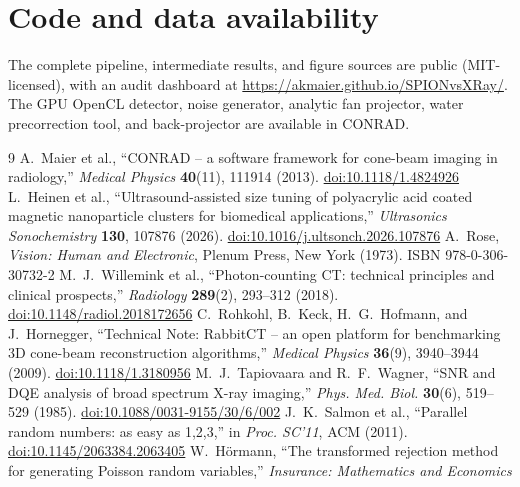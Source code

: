 \documentclass[]{spie}  %
\begin{document}
\section*{Code and data availability}
The complete pipeline, intermediate results, and figure sources are public
(MIT-licensed), with an audit dashboard at
\url{https://akmaier.github.io/SPIONvsXRay/}. The GPU OpenCL detector, noise
generator, analytic fan projector, water precorrection tool, and back-projector
are available in CONRAD.


\begin{thebibliography}{9}
\scriptsize
\setlength{\itemsep}{2pt}
\setlength{\parsep}{0pt}
\setlength{\parskip}{-1.1ex}
 A.~Maier et al., ``CONRAD -- a software framework for cone-beam
imaging in radiology,'' \emph{Medical Physics} \textbf{40}(11), 111914 (2013).
\href{https://doi.org/10.1118/1.4824926}{doi:10.1118/1.4824926}
 L.~Heinen et al., ``Ultrasound-assisted size tuning of
polyacrylic acid coated magnetic nanoparticle clusters for biomedical
applications,'' \emph{Ultrasonics Sonochemistry} \textbf{130}, 107876 (2026).
\href{https://doi.org/10.1016/j.ultsonch.2026.107876}{doi:10.1016/j.ultsonch.2026.107876}
 A.~Rose, \emph{Vision: Human and Electronic}, Plenum Press, New York
(1973). ISBN 978-0-306-30732-2
 M.~J.~Willemink et al., ``Photon-counting CT: technical
principles and clinical prospects,'' \emph{Radiology} \textbf{289}(2), 293--312
(2018). \href{https://doi.org/10.1148/radiol.2018172656}{doi:10.1148/radiol.2018172656}
 C.~Rohkohl, B.~Keck, H.~G.~Hofmann, and J.~Hornegger,
``Technical Note: RabbitCT -- an open platform for benchmarking 3D cone-beam
reconstruction algorithms,'' \emph{Medical Physics} \textbf{36}(9), 3940--3944
(2009). \href{https://doi.org/10.1118/1.3180956}{doi:10.1118/1.3180956}
 M.~J.~Tapiovaara and R.~F.~Wagner, ``SNR and DQE analysis
of broad spectrum X-ray imaging,'' \emph{Phys. Med. Biol.} \textbf{30}(6), 519--529
(1985). \href{https://doi.org/10.1088/0031-9155/30/6/002}{doi:10.1088/0031-9155/30/6/002}
 J.~K.~Salmon et al., ``Parallel random numbers: as easy as
1,2,3,'' in \emph{Proc. SC'11}, ACM (2011).
\href{https://doi.org/10.1145/2063384.2063405}{doi:10.1145/2063384.2063405}
 W.~H\"ormann, ``The transformed rejection method for
generating Poisson random variables,'' \emph{Insurance: Mathematics and Economics}

\end{thebibliography}
\end{document}
